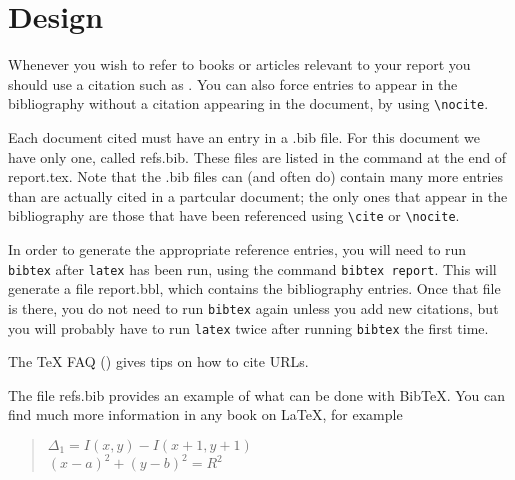 \chapter{Design}
\label{cha:des}
Whenever you wish to refer to books or articles relevant to your report
you should use a citation such as \cite{lamport}. You can also force
entries to appear in the bibliography without  a citation appearing in
the document, by using \verb=\nocite=.  

\nocite{boyle,rd-only} 

Each document cited must have an entry in a \textsf{.bib} file. For this
document we have only one, called \textsf{refs.bib}. These files are
listed in the \verb== command at the end of
\textsf{report.tex}. Note that the \textsf{.bib} files can (and often
do) contain many more entries than are actually cited in a partcular
document; the only ones that appear in the bibliography are those that
have been referenced using \verb=\cite= or \verb=\nocite=.

In order to generate the appropriate reference entries, you will need
to run \texttt{bibtex} after \texttt{latex} has been run, using the
command \texttt{bibtex report}. This will generate a file
\textsf{report.bbl}, which contains the bibliography entries. Once
that file is there, you do not need to run \texttt{bibtex} again
unless you add new citations, but you will probably have to run
\texttt{latex} twice after running \texttt{bibtex} the first time.

The \TeX{} FAQ (\cite{url-cite}) gives tips on how to cite URLs.

The file \textsf{refs.bib} provides an example of what can be done
with Bib\TeX. You can find much more information in any book on
\LaTeX, for example \cite{lamport,companion,kopka}



\begin{quote}
\centering
$\Delta_1=I(x,y)-I(x+1,y+1)$ \\
$(x-a)^2+(y-b)^2=R^2$
\end{quote}